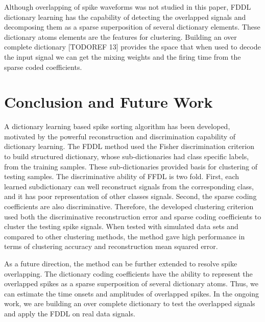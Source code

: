 \documentclass[conference]{IEEEtran}
\begin{document}
	Although overlapping of spike waveforms was not studied in this paper, FDDL dictionary learning has the capability of detecting the overlapped signals and decomposing them as a sparse superposition of several dictionary elements. These dictionary atoms elements are the features for clustering. Building an over complete dictionary [TODOREF 13] provides the space that when used to decode the input signal we can get the mixing weights and the firing time from the sparse coded coefficients.
	
	\section{Conclusion and Future Work}
	A dictionary learning based spike sorting algorithm has been developed, motivated by the powerful reconstruction and discrimination capability of dictionary learning. The FDDL method used the Fisher discrimination criterion to build structured dictionary, whose sub-dictionaries had class specific labels, from the training samples. These sub-dictionaries provided basis for clustering of testing samples. The discriminative ability of FFDL is two fold. First, each learned subdictionary can well reconstruct signals from the corresponding class, and it has poor representation of other classes signals. Second, the sparse coding coefficients are also discriminative. Therefore, the developed clustering criterion used both the discriminative reconstruction error and sparse coding coefficients to cluster the testing spike signals. When tested with simulated data sets and compared to other clustering methods, the method gave high performance in terms of clustering accuracy and reconstruction mean squared error.

	As a future direction, the method can be further extended to resolve spike overlapping. The dictionary coding coefficients have the ability to represent the overlapped spikes as a sparse superposition of several dictionary atoms. Thus, we can estimate the time onsets and amplitudes of overlapped spikes. In the ongoing work, we are building an over complete dictionary to test the overlapped signals and apply the FDDL on real data signals.
	
\end{document}
